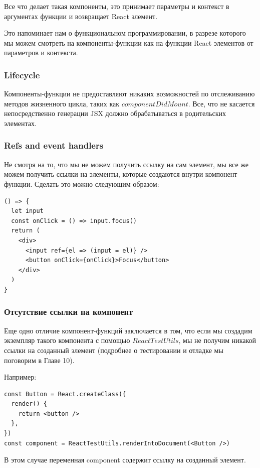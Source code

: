 Все что делает такая компоненты, это принимает параметры и контекст в аргументах функции и возвращает React элемент.

Это напоминает нам о функциональном программировании, в разрезе которого мы можем смотреть на компоненты-функции как на функции React элементов от параметров и контекста.

\subsubsection{Lifecycle}

Компоненты-функции не предоставляют никаких возможностей по отслеживанию методов жизненного цикла, таких как $componentDidMount$. Все, что не касается непосредственно генерации JSX должно обрабатываться в родительских элементах.

\subsubsection{Refs and event handlers}

Не смотря на то, что мы не можем получить ссылку на сам элемент, мы все же можем получить ссылки на элементы, которые создаются внутри компонент-функции. Сделать это можно следующим образом:

\begin{lstlisting}
() => {
  let input
  const onClick = () => input.focus()
  return (
    <div>
      <input ref={el => (input = el)} />
      <button onClick={onClick}>Focus</button>
    </div>
  ) 
}
\end{lstlisting}

\subsubsection{Отсутствие ссылки на компонент}

Еще одно отличие компонент-функций заключается в том, что если мы создадим экземпляр такого компонента с помощью $ReactTestUtils$, мы не получим никакой ссылки на созданный элемент (подробнее о тестировании и отладке мы поговорим в Главе 10).

Например:

\begin{lstlisting}
const Button = React.createClass({
  render() {
    return <button />
  },
})
const component = ReactTestUtils.renderIntoDocument(<Button />)
\end{lstlisting}

В этом случае переменная component содержит ссылку на созданный элемент.


